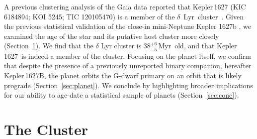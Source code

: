 \documentclass[12pt,modern,twocolumn,tighten]{aastex63}
\newcommand{\cn}{$\delta$\ Lyr\ cluster} %
\newcommand{\sn}{Kepler\,1627} %
\newcommand{\clusterage}{$38^{+6}_{-5}$\,Myr} %
\begin{document}
A previous clustering analysis of the Gaia data reported that
Kepler\,1627 (KIC 6184894; KOI 5245; TIC 120105470) is a member of the
\cn\ \citep{kounkel_untangling_2019}.  Given the previous statistical
validation of the close-in mini-Neptune Kepler 1627b
\citep{2012ApJS..199...24T,morton_false_2016,thompson_planetary_2018},
we examined the age of the star and its putative host cluster more
closely (Section~\ref{sec:cluster}).  We find that the $\delta$ Lyr
cluster is \clusterage\ old, and that \sn\ is indeed a member of the
cluster.  Focusing on the planet itself, we confirm that despite the
presence of a previously unreported binary companion, hereafter
Kepler\,1627B, the planet orbits the G-dwarf primary on an orbit that
is likely prograde
(Section~\ref{sec:planet}).  We conclude by highlighting broader
implications for our ability to age-date a statistical sample of
planets (Section~\ref{sec:conc}).


\section{The Cluster}
\label{sec:cluster}
\end{document}
